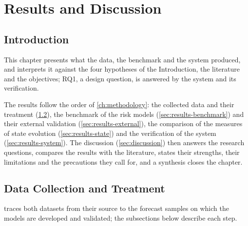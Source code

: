 \documentclass[11pt,a4paper,oneside]{report}
\begin{document}
\chapter{Results and Discussion}\label{ch:results}

\section{Introduction}\label{sec:results-intro}

This chapter presents what the data, the benchmark and the system produced, and interprets it against the four hypotheses of the Introduction, the literature and the objectives; RQ1, a design question, is answered by the system and its verification.

The results follow the order of \cref{ch:methodology}: the collected data and their treatment (\cref{sec:results-data}), the benchmark of the risk models (\cref{sec:results-benchmark}) and their external validation (\cref{sec:results-external}), the comparison of the measures of state evolution (\cref{sec:results-state}) and the verification of the system (\cref{sec:results-system}). The discussion (\cref{sec:discussion}) then answers the research questions, compares the results with the literature, states their strengths, their limitations and the precautions they call for, and a synthesis closes the chapter.

\section{Data Collection and Treatment}\label{sec:results-data}

 traces both datasets from their source to the forecast samples on which the models are developed and validated; the subsections below describe each step.
\end{document}
